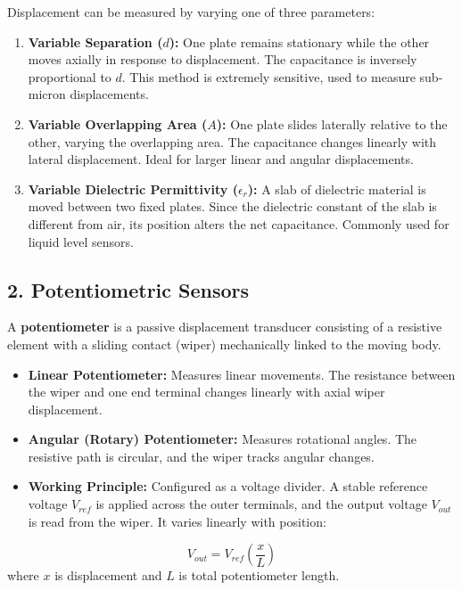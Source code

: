 Displacement can be measured by varying one of three parameters:
\begin{enumerate}
  \item \textbf{Variable Separation ($d$):} One plate remains stationary while the other moves axially in response to displacement. The capacitance is inversely proportional to $d$. This method is extremely sensitive, used to measure sub-micron displacements.
  \item \textbf{Variable Overlapping Area ($A$):} One plate slides laterally relative to the other, varying the overlapping area. The capacitance changes linearly with lateral displacement. Ideal for larger linear and angular displacements.
  \item \textbf{Variable Dielectric Permittivity ($\epsilon_r$):} A slab of dielectric material is moved between two fixed plates. Since the dielectric constant of the slab is different from air, its position alters the net capacitance. Commonly used for liquid level sensors.
\end{enumerate}

\subsection{2. Potentiometric Sensors}
A \textbf{potentiometer} is a passive displacement transducer consisting of a resistive element with a sliding contact (wiper) mechanically linked to the moving body.
\begin{itemize}
  \item   \textbf{Linear Potentiometer:} Measures linear movements. The resistance between the wiper and one end terminal changes linearly with axial wiper displacement.
  \item   \textbf{Angular (Rotary) Potentiometer:} Measures rotational angles. The resistive path is circular, and the wiper tracks angular changes.
  \item   \textbf{Working Principle:} Configured as a voltage divider. A stable reference voltage $V_{ref}$ is applied across the outer terminals, and the output voltage $V_{out}$ is read from the wiper. It varies linearly with position:
\end{itemize}
    \[ V_{out} = V_{ref} \left( \frac{x}{L} \right) \]
    where $x$ is displacement and $L$ is total potentiometer length.

